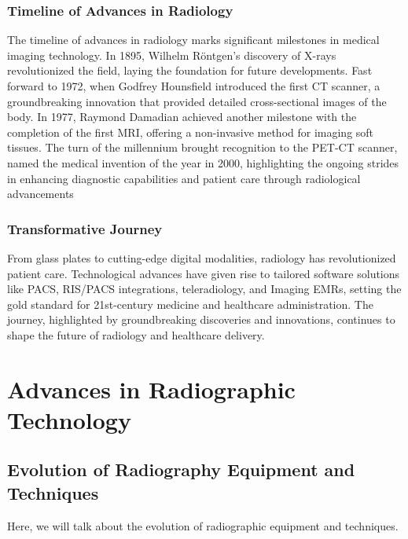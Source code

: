 \documentclass[a4paper,12pt]{report}
\begin{document}
\subsection{Timeline of Advances in Radiology}
The timeline of advances in radiology marks significant milestones in medical imaging
technology. In 1895, Wilhelm Röntgen's discovery of X-rays revolutionized the field, laying the
foundation for future developments. Fast forward to 1972, when Godfrey Hounsfield introduced
the first CT scanner, a groundbreaking innovation that provided detailed cross-sectional images
of the body. In 1977, Raymond Damadian achieved another milestone with the completion of the
first MRI, offering a non-invasive method for imaging soft tissues. The turn of the millennium
brought recognition to the PET-CT scanner, named the medical invention of the year in 2000,
highlighting the ongoing strides in enhancing diagnostic capabilities and patient care through
radiological advancements

\subsection{Transformative Journey}
From glass plates to cutting-edge digital modalities, radiology has revolutionized patient care.
Technological advances have given rise to tailored software solutions like PACS, RIS/PACS
integrations, teleradiology, and Imaging EMRs, setting the gold standard for 21st-century medicine
and healthcare administration. The journey, highlighted by groundbreaking discoveries and
innovations, continues to shape the future of radiology and healthcare delivery.

\chapter{Advances  in Radiographic Technology}
\section{Evolution of Radiography Equipment and Techniques}
Here, we will talk about the evolution of radiographic equipment and techniques. 
 
\end{document}
